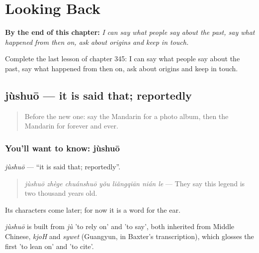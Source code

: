 
\chapter{Looking Back}
\label{ch:zh-looking-back}

\begin{chapteropening}
\textbf{By the end of this chapter:} \emph{I can say what people say about the past, say what happened from then on, ask about origins and keep in touch.}

Complete the last lesson of chapter 345: I can say what people say about the past, say what happened from then on, ask about origins and keep in touch.
\end{chapteropening}

\section[jùshuō]{jùshuō — it is said that; reportedly}

\label{lesson:ZH-C345-jushuo}



\begin{quote}
Before the new one: say the Mandarin for a photo album, then the Mandarin for forever and ever.
\end{quote}

\subsection*{You'll want to know: jùshuō}
\emph{jùshuō} — \textquotedblleft{}it is said that; reportedly\textquotedblright{}.

\begin{quote}
\emph{jùshuō zhège chuánshuō yǒu liǎngqiān nián le} — They say this legend is two thousand years old.
\end{quote}

Its characters come later; for now it is a word for the ear.

\begin{cousinweb}
\emph{jùshuō} is built from \emph{jù} 'to rely on' and  'to say', both inherited from Middle Chinese, \emph{kjoH} and \emph{sywet} (Guangyun, in Baxter's transcription), which glosses the first 'to lean on' and 'to cite'.
\end{cousinweb}

